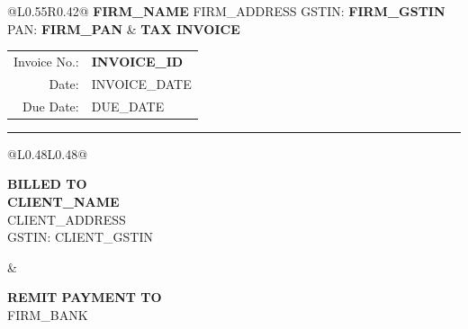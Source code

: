 \documentclass[11pt,a4paper]{article}
\begin{document}
\color{textPrimary}

\begin{tabular}{@{}L{0.55\textwidth}R{0.42\textwidth}@{}}
  {\LARGE\bfseries\color{accentBlue} {{FIRM_NAME}}}
  \newline
  \vspace{2pt}
  {\small\color{textSecondary} {{FIRM_ADDRESS}}}
  \newline
  {\small\color{textSecondary} GSTIN: \textbf{{{FIRM_GSTIN}}} \quad PAN: \textbf{{{FIRM_PAN}}}}
  &
  {\LARGE\bfseries TAX INVOICE}
  \newline
  \vspace{4pt}
  {\small\color{textSecondary}
    \begin{tabular}{@{}rl@{}}
      Invoice No.: & \textbf{{{INVOICE_ID}}} \\[2pt]
      Date:        & {{INVOICE_DATE}} \\[2pt]
      Due Date:    & {{DUE_DATE}} \\
    \end{tabular}
  }
\end{tabular}

\vspace{2mm}
{\color{borderGray}\rule{\textwidth}{0.4pt}}
\vspace{3mm}

\begin{tabular}{@{}L{0.48\textwidth}L{0.48\textwidth}@{}}
  \begin{minipage}[t]{0.46\textwidth}\vspace{3pt}
    {\small\bfseries\color{textSecondary} BILLED TO}\\[4pt]
    {\bfseries {{CLIENT_NAME}}}\\[2pt]
    {\small {{CLIENT_ADDRESS}}}\\[2pt]
    {\small GSTIN: {{CLIENT_GSTIN}}}
    \vspace{3pt}
  \end{minipage}
  &
  \begin{minipage}[t]{0.46\textwidth}\vspace{3pt}
    {\small\bfseries\color{textSecondary} REMIT PAYMENT TO}\\[4pt]
    {\small {{FIRM_BANK}}}
    \vspace{3pt}
  \end{minipage}
\end{tabular}
\end{document}
